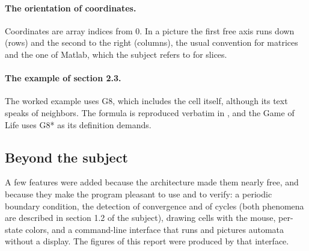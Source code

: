 \paragraph{The orientation of coordinates.} Coordinates are array indices from 0. In a picture
the first free axis runs down (rows) and the second to the right (columns), the usual convention
for matrices and the one of Matlab, which the subject refers to for slices.

\paragraph{The example of section 2.3.} The worked example uses G8, which includes the cell
itself, although its text speaks of neighbors. The formula is reproduced verbatim in
, and the Game of Life uses G8* as its definition demands.

\subsection{Beyond the subject}

A few features were added because the architecture made them nearly free, and because they make
the program pleasant to use and to verify: a periodic boundary condition, the detection of
convergence and of cycles (both phenomena are described in section 1.2 of the subject), drawing
cells with the mouse, per-state colors, and a command-line interface that runs and pictures
automata without a display. The figures of this report were produced by that interface.
